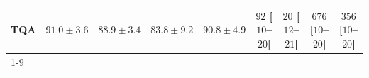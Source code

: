 \begin{tabular}{l|cccc|cccc|}
TQA & {\cellcolor[HTML]{046097}} \color[HTML]{F1F1F1} $91.0\pm 3.6$ & {\cellcolor[HTML]{0568A3}} \color[HTML]{F1F1F1} $88.9\pm 3.4$ & {\cellcolor[HTML]{2081B9}} \color[HTML]{F1F1F1} $83.8\pm 9.2$ & {\cellcolor[HTML]{046198}} \color[HTML]{F1F1F1} $90.8\pm 4.9$ & {\cellcolor[HTML]{FDE1DE}} \color[HTML]{000000} $92$ [$10$--$20$] & {\cellcolor[HTML]{FFF3EF}} \color[HTML]{000000} $20$ [$12$--$21$] & {\cellcolor[HTML]{7C0177}} \color[HTML]{F1F1F1} $676$ [$10$--$20$] & {\cellcolor[HTML]{F87AA8}} \color[HTML]{F1F1F1} $356$ [$10$--$20$] \\
\cline{1-9}
\bottomrule
\end{tabular}

